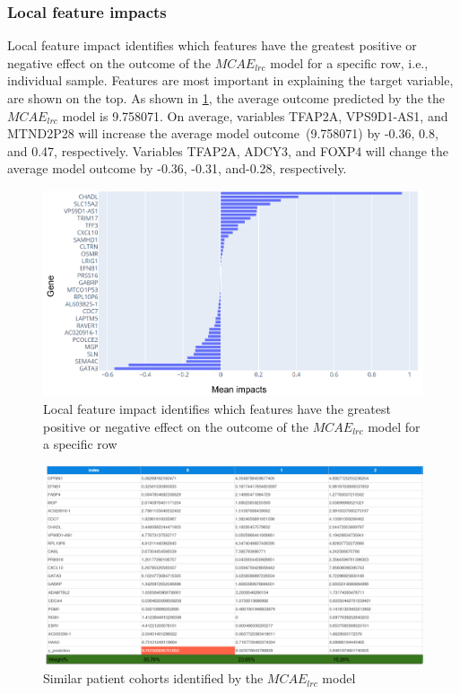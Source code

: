 \subsubsection{Local feature impacts}
Local feature impact identifies which features have the greatest positive or negative effect on the outcome of the $MCAE_{lrc}$ model for a specific row, i.e., individual sample. Features are most important in explaining the target variable, are shown on the top. As shown in \cref{fig:local_feature_impacts}, the average outcome predicted by the the $MCAE_{lrc}$ model is 9.758071. On average, variables TFAP2A, VPS9D1-AS1, and MTND2P28 will increase the average model outcome~(9.758071) by -0.36, 0.8, and 0.47, respectively. Variables TFAP2A, ADCY3, and FOXP4 will change the average model outcome by -0.36, -0.31, and-0.28, respectively. 

\begin{figure}[h]
    \centering
	\includegraphics[scale=1.2]{images/local_fi_1.png}
	\caption[Local feature impact identifies which features have the greatest positive/negative effect]{Local feature impact identifies which features have the greatest positive or negative effect on the outcome of the $MCAE_{lrc}$ model for a specific row}
    \label{fig:local_feature_impacts}
\end{figure}

\begin{figure}[h]
    \centering
	\includegraphics[scale=0.65]{images/similar_profiles.png}
	\caption{Similar patient cohorts identified by the $MCAE_{lrc}$ model}
    \label{fig:similar_patients}
\end{figure}

